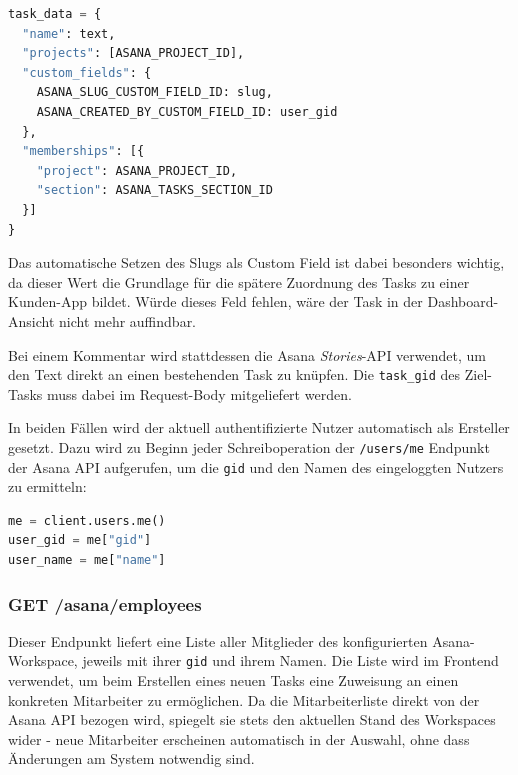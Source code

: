 \begin{lstlisting}[language=Python, caption={Erstellung eines neuen Asana-Tasks}, label={lst:asana-create-task}]
task_data = {
  "name": text,
  "projects": [ASANA_PROJECT_ID],
  "custom_fields": {
    ASANA_SLUG_CUSTOM_FIELD_ID: slug,
    ASANA_CREATED_BY_CUSTOM_FIELD_ID: user_gid
  },
  "memberships": [{
    "project": ASANA_PROJECT_ID,
    "section": ASANA_TASKS_SECTION_ID
  }]
}
\end{lstlisting}

Das automatische Setzen des Slugs als Custom Field ist dabei besonders wichtig, da dieser Wert die Grundlage für die spätere Zuordnung des Tasks zu einer Kunden-App bildet. Würde dieses Feld fehlen, wäre der Task in der Dashboard-Ansicht nicht mehr auffindbar.

Bei einem Kommentar wird stattdessen die Asana \textit{Stories}-API verwendet, um den Text direkt an einen bestehenden Task zu knüpfen. Die \texttt{task\_gid} des Ziel-Tasks muss dabei im Request-Body mitgeliefert werden.

In beiden Fällen wird der aktuell authentifizierte Nutzer automatisch als Ersteller gesetzt. Dazu wird zu Beginn jeder Schreiboperation der \texttt{/users/me} Endpunkt der Asana API aufgerufen, um die \texttt{gid} und den Namen des eingeloggten Nutzers zu ermitteln:

\begin{lstlisting}[language=Python, caption={Ermittlung des aktuellen Nutzers über die Asana API}, label={lst:asana-current-user}]
me = client.users.me()
user_gid = me["gid"]
user_name = me["name"]
\end{lstlisting}

\subsubsection{GET /asana/employees}
Dieser Endpunkt liefert eine Liste aller Mitglieder des konfigurierten Asana-Workspace, jeweils mit ihrer \texttt{gid} und ihrem Namen. Die Liste wird im Frontend verwendet, um beim Erstellen eines neuen Tasks eine Zuweisung an einen konkreten Mitarbeiter zu ermöglichen. Da die Mitarbeiterliste direkt von der Asana API bezogen wird, spiegelt sie stets den aktuellen Stand des Workspaces wider - neue Mitarbeiter erscheinen automatisch in der Auswahl, ohne dass Änderungen am System notwendig sind.